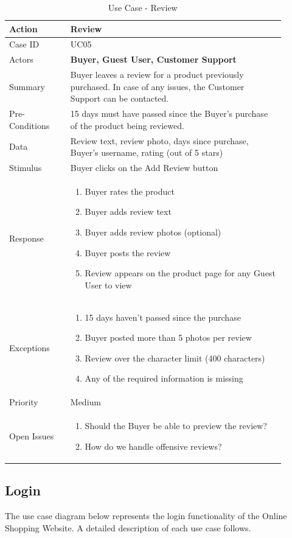 \documentclass[11pt]{article}
\newcounter{use case ID}
\newcommand\tabularhead[1]{
    \begin{table}[ht]
        \addtocounter{use case ID}{1}
        \caption{Use Case \arabic{use case ID} - #1}
        \vspace{0.2cm}
        \begin{tabular}{|p{0.2\linewidth}|p{0.70\linewidth}|}
            \hline
            \textbf{Action} & \textbf{#1} \\
            \hline}
\newcommand\addrow[2]{#1 & #2\\ \hline}
\newcommand\addmulrow[2]{ \begin{minipage}[t][][t]{2.5cm}#1\end{minipage}
                &\begin{minipage}[t][][t]{11cm}
                    \begin{enumerate}[itemsep=-1ex] #2   \end{enumerate}
                \end{minipage}\vfill\\ \hline}
\newenvironment{usecase}{\tabularhead}
        {\hline\end{tabular}\end{table}}
\newcounter{req ID}
\begin{document}
\begin{usecase}{Review}
    \addrow{Case ID}{UC05}
    \addrow{Actors}{\textbf{Buyer, Guest User, Customer Support}}
    \addrow{Summary}{\index{buyer}Buyer leaves a \index{review}review for a product previously purchased. In case of any issues, the Customer Support can be contacted.}
    \addrow{Pre-Conditions}{
        15 days must have passed since the \index{buyer}Buyer’s purchase of the \index{product}product being reviewed.
        }
    \addrow{\index{data}Data}{
Review text, \index{review}review photo, days since purchase, Buyer’s username, rating (out of 5 stars)
}
    \addrow{Stimulus}{Buyer clicks on the Add Review button}
    \addmulrow{Response}{
        \item \index{buyer}Buyer rates the \index{product}product
        \item Buyer adds \index{review}review text
        \item Buyer adds review photos (optional)
        \item Buyer posts the review
        \item Review appears on the product page for any \index{guest user}Guest User to view
    }
    \addmulrow{Exceptions}{
        \item 15 days haven’t passed since the purchase
        \item Buyer posted more than 5 photos per \index{review}review
        \item Review over the character limit (400 characters)
        \item Any of the required \index{information}information is missing
    }
    \addrow{Priority}{Medium}
    \addmulrow{Open Issues}{
        \item Should the \index{buyer}Buyer be able to preview the review?
        \item How do we handle offensive \index{review}reviews?
    }
\end{usecase}


\clearpage
\subsection{Login}

The use case diagram below represents the login functionality of the Online Shopping Website. A detailed description of each use case follows.
\end{document}

